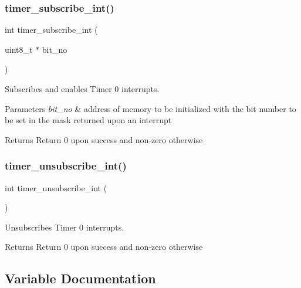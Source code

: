 \subsubsection{\texorpdfstring{timer\_subscribe\_int()}{timer\_subscribe\_int()}}
{\footnotesize\ttfamily int timer\+\_\+subscribe\+\_\+int (\begin{DoxyParamCaption}\item[{uint8\+\_\+t $\ast$}]{bit\+\_\+no }\end{DoxyParamCaption})}



Subscribes and enables Timer 0 interrupts. 


\begin{DoxyParams}{Parameters}
{\em bit\+\_\+no} & address of memory to be initialized with the bit number to be set in the mask returned upon an interrupt \\
\hline
\end{DoxyParams}
\begin{DoxyReturn}{Returns}
Return 0 upon success and non-\/zero otherwise 
\end{DoxyReturn}
\mbox{\label{group__timer_gab9eea51549744bca5c5c923b388bb4ee}} 
\subsubsection{\texorpdfstring{timer\_unsubscribe\_int()}{timer\_unsubscribe\_int()}}
{\footnotesize\ttfamily int timer\+\_\+unsubscribe\+\_\+int (\begin{DoxyParamCaption}{ }\end{DoxyParamCaption})}



Unsubscribes Timer 0 interrupts. 

\begin{DoxyReturn}{Returns}
Return 0 upon success and non-\/zero otherwise 
\end{DoxyReturn}


\subsection{Variable Documentation}
\mbox{\label{group__timer_gad1c0daae1fe44fc16a05f435123a99f2}} 

